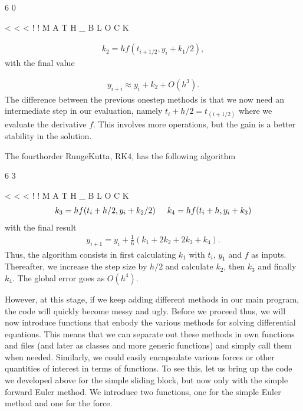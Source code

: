 \documentclass[letterpaper,10pt,english]{sphinxmanual}
\begin{document}
6
0

\textless{}
\textless{}
\textless{}
!
!
M
A
T
H
\_
B
L
O
C
K




\begin{equation*}
\begin{split}
\begin{equation}
k_2=hf(t_{i+1/2},y_i+k_1/2),
\label{_auto23} \tag{32}
\end{equation}
\end{split}
\end{equation*}
with the final value




\begin{equation*}
\begin{split}
\begin{equation} 
y_{i+i}\approx y_i + k_2 +O(h^3). 
\label{_auto24} \tag{33}
\end{equation}
\end{split}
\end{equation*}
The difference between the previous one\sphinxhyphen{}step methods
is that we now need an intermediate step in our evaluation,
namely \(t_i+h/2 = t_{(i+1/2)}\) where we evaluate the derivative \(f\).
This involves more operations, but the gain is a better stability
in the solution.

The fourth\sphinxhyphen{}order Runge\sphinxhyphen{}Kutta, RK4, has the following algorithm

6
3

\textless{}
\textless{}
\textless{}
!
!
M
A
T
H
\_
B
L
O
C
K
\begin{equation*}
\begin{split}
k_3=hf(t_i+h/2,y_i+k_2/2)\hspace{0.5cm}   k_4=hf(t_i+h,y_i+k_3)
\end{split}
\end{equation*}
with the final result
\begin{equation*}
\begin{split}
y_{i+1}=y_i +\frac{1}{6}\left( k_1 +2k_2+2k_3+k_4\right).
\end{split}
\end{equation*}
Thus, the algorithm consists in first calculating \(k_1\)
with \(t_i\), \(y_1\) and \(f\) as inputs. Thereafter, we increase the step
size by \(h/2\) and calculate \(k_2\), then \(k_3\) and finally \(k_4\). The global error goes as \(O(h^4)\).

However, at this stage, if we keep adding different methods in our
main program, the code will quickly become messy and ugly. Before we
proceed thus, we will now introduce functions that enbody the various
methods for solving differential equations. This means that we can
separate out these methods in own functions and files (and later as classes and more
generic functions) and simply call them when needed. Similarly, we
could easily encapsulate various forces or other quantities of
interest in terms of functions. To see this, let us bring up the code
we developed above for the simple sliding block, but now only with the simple forward Euler method. We introduce
two functions, one for the simple Euler method and one for the
force.
\end{document}

